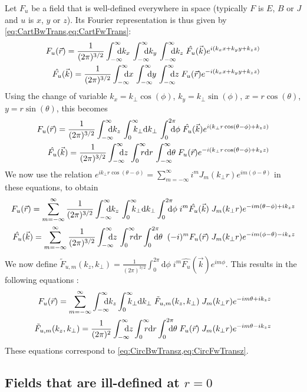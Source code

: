 Let $F_u$ be a field that is well-defined everywhere in space
(typically $F$ is $E$, $B$ or $J$ and $u$ is $x$, $y$ or $z$). Its Fourier representation
is thus given by \cref{eq:CartBwTrans,eq:CartFwTrans}:
\begin{align*}
F_u(\vec{r}) = \frac{1}{(2\pi)^{3/2}}\Integ{k_x} \,\Integ{k_y}\,
\Integ{k_z} \; \hat{F_u}(\vec{k}) e^{i(k_x x + k_y y + k_z z)} \\
\hat{F_u}(\vec{k})  = \frac{1}{(2\pi)^{3/2}}\Integ{x} \,\Integ{y}\,
\Integ{z} \; F_u(\vec{r}) e^{-i(k_x x + k_y y + k_z z)} 
\end{align*}
Using the change of variable $k_x=k_\perp\cos(\phi)$, $k_y = k_\perp\sin(\phi)$,
$x=r\cos(\theta)$, $y=r\sin(\theta)$, this becomes
 \begin{align*}
F_u(\vec{r}) = \frac{1}{(2\pi)^{3/2}}\Integ{k_z} \,\RInteg{k_\perp}\,
\TInteg{\phi} \; \hat{F_u}(\vec{k})
e^{i(k_\perp r \cos(\theta-\phi) + k_z z)} \\
\hat{F_u}(\vec{k})   = \frac{1}{(2\pi)^{3/2}}\Integ{z} \,\RInteg{r}\,
\Integ{\theta} \; F_u(\vec{r}) e^{-i(k_\perp r \cos(\theta-\phi) + k_z z)} 
\end{align*}
We now use the relation $e^{ik_\perp r\cos(\theta-\phi)} =
\sum_{m=-\infty}^{\infty} i^m J_m(k_\perp r) e^{im(\phi-\theta)}$ in these equations, to obtain
\begin{align*}
F_u (\vec{r})  = \sum_{m=-\infty}^{\infty} \frac{1}{(2\pi)^{3/2}}\Integ{k_z} \,\RInteg{k_\perp }
\TInteg{\phi} \; i^m \hat{F_u}(\vec{k}) \;
J_m(k_\perp r) e^{-im(\theta-\phi) + ik_z z} \\
\hat{F_u}(\vec{k})   =  \sum_{m=-\infty}^{\infty} \frac{1}{(2\pi)^{3/2}}\Integ{z} \,\RInteg{r}
\TInteg{\theta} \;\; (-i)^m F_u(\vec{r}) \; J_m(k_\perp r) e^{-im(\phi-\theta) -ik_z z} 
\end{align*}
We now define $\tilde{F}_{u,m}(k_z,k_\perp ) = \frac{1}{(2\pi)^{3/2}}\int_0^{2\pi}
\mathrm{d}\phi \; i^m \hat{F_u}(\vec{k})
e^{im\phi}$. This results in the following equations :
\begin{align*}
F_u(\vec{r}) = \sum_{m=-\infty}^{\infty} \Integ{k_z}
\RInteg{k_\perp }\; \tilde{F}_{u,m}(k_z,k_\perp ) \; J_m(k_\perp r) e^{-im\theta + ik_z z} 
\\
\tilde{F}_{u,m}(k_z,k_\perp ) = \frac{1}{(2\pi)^2} \Integ{z} \RInteg{r}
\TInteg{\theta} \;F_u(\vec{r})\; J_m(k_\perp r) e^{-im\theta
 - i k_z z}
\end{align*}
These equations correspond to \cref{eq:CircBwTransz,eq:CircFwTransz}.

\subsection{Fields that are ill-defined at $r=0$}


